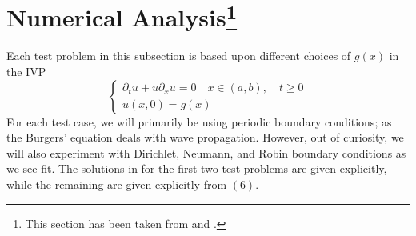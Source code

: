 \documentclass{myproject}
\begin{document}
\section{Numerical Analysis\protect\footnote{This section has been taken from \cite{learncfd} and \cite{trefethen2001}.}}
Each test problem in this subsection is based upon different choices of $g(x)$ in the IVP
\begin{equation}
    \begin{cases}
        \partial_t{u} + u\partial_x{u} = 0 \quad x \in (a,b), \quad t \geq 0 \\
        u(x, 0) = g(x)
    \end{cases}
\end{equation}
For each test case, we will primarily be using periodic boundary conditions; as the Burgers' equation deals with wave propagation. However, out of curiosity, we will also experiment with Dirichlet, Neumann, and Robin boundary conditions as we see fit. The solutions in for the first two test problems are given explicitly, while the remaining are given explicitly from $(6)$.
\end{document}
